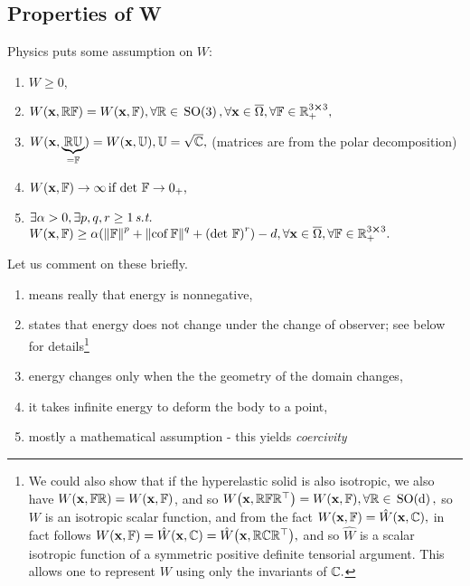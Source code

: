 \documentclass[11pt]{scrartcl} %
\begin{document}
\subsection{Properties of W}
\label{sec:propetiesW}
Physics puts some assumption on $W:$
\begin{enumerate}
	\item $W\geq 0,$ 
	\item $W\qty(\vb{x},\mathbb{R} \mathbb{F}) = W\qty(\vb{x},\mathbb{F}), \forall \mathbb{R} \in \, \text{SO(3)} \,, \forall \vb{x} \in \overline{\Omega}, \forall \mathbb{F} \in {\mathbb R}^{3 \cross 3}_+,$ 
	\item $W(\vb{x}, \underbrace{\mathbb{R} \mathbb{U}}_{=\mathbb{F}}) = W\qty(\vb{x}, \mathbb{U}), \mathbb{U}=\sqrt{\mathbb{C}},$ (matrices are from the polar decomposition)
	\item $W\qty(\vb{x},\mathbb{F}) \to \infty \, \text{if} \, \det\, \mathbb{F} \to 0_+,$ 
	\item $\exists \alpha >0, \exists p,q,r \geq 1 \, \text{\textit{s.t.}} \,$ $W\qty(\vb{x},\mathbb{F}) \geq \alpha\qty(\norm{\mathbb{F}}^p + \norm{\operatorname{cof} \mathbb{F}}^q + \qty(\det\, \mathbb{F})^r)-d, \forall \vb{x} \in \overline{\Omega}, \forall \mathbb{F} \in {\mathbb R}^{3 \cross 3}_+.$
\end{enumerate}
Let us comment on these briefly.
\begin{enumerate}
	\item means really that energy is nonnegative,
	\item states that energy does not change under the change of observer; see below for details\footnote{We could also show that if the hyperelastic solid is also isotropic, we also have $W\qty(\vb{x}, \mathbb{F} \mathbb{R}) = W\qty(\vb{x},\mathbb{F})$, and so $W\qty(\vb{x}, \mathbb{R}\mathbb{F} \mathbb{R}^\top) = W\qty(\vb{x}, \mathbb{F}), \forall \mathbb{R} \in \, \text{SO(d)} \,,$ so $W$ is an isotropic scalar function, and from the fact $W\qty(\vb{x},\mathbb{F}) = \hat{W}\qty(\vb{x}, \mathbb{C}),$ in fact follows $W\qty(\vb{x}, \mathbb{F}) = \hat{W}\qty(\vb{x}, \mathbb{C} ) = \hat{W}\qty(\vb{x}, \mathbb{R} \mathbb{C} \mathbb{R}^\top),$ and so $\hat{W}$ is a scalar isotropic function of a symmetric positive definite tensorial argument. This allows one to represent $W$ using only the invariants of $\mathbb{C}.$}
	\item energy changes only when the the geometry of the domain changes,
	\item it takes infinite energy to deform the body to a point,
	\item mostly a mathematical assumption - this yields \textit{coercivity}
\end{enumerate}
\end{document}
